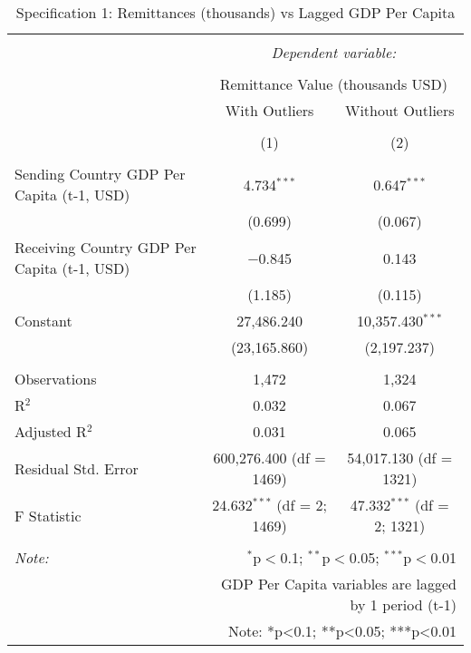 
\begin{table}[!htbp] \centering 
  \caption{Specification 1: Remittances (thousands) vs Lagged GDP Per Capita} 
  \label{} 
\begin{tabular}{@{\extracolsep{5pt}}lcc} 
\\[-1.8ex]\hline 
\hline \\[-1.8ex] 
 & \multicolumn{2}{c}{\textit{Dependent variable:}} \\ 
\cline{2-3} 
\\[-1.8ex] & \multicolumn{2}{c}{Remittance Value (thousands USD)} \\ 
 & With Outliers & Without Outliers \\ 
\\[-1.8ex] & (1) & (2)\\ 
\hline \\[-1.8ex] 
 Sending Country GDP Per Capita (t-1, USD) & 4.734$^{***}$ & 0.647$^{***}$ \\ 
  & (0.699) & (0.067) \\ 
  Receiving Country GDP Per Capita (t-1, USD) & $-$0.845 & 0.143 \\ 
  & (1.185) & (0.115) \\ 
  Constant & 27,486.240 & 10,357.430$^{***}$ \\ 
  & (23,165.860) & (2,197.237) \\ 
 \hline \\[-1.8ex] 
Observations & 1,472 & 1,324 \\ 
R$^{2}$ & 0.032 & 0.067 \\ 
Adjusted R$^{2}$ & 0.031 & 0.065 \\ 
Residual Std. Error & 600,276.400 (df = 1469) & 54,017.130 (df = 1321) \\ 
F Statistic & 24.632$^{***}$ (df = 2; 1469) & 47.332$^{***}$ (df = 2; 1321) \\ 
\hline 
\hline \\[-1.8ex] 
\textit{Note:}  & \multicolumn{2}{r}{$^{*}$p$<$0.1; $^{**}$p$<$0.05; $^{***}$p$<$0.01} \\ 
 & \multicolumn{2}{r}{GDP Per Capita variables are lagged by 1 period (t-1)} \\ 
 & \multicolumn{2}{r}{Note: *p<0.1; **p<0.05; ***p<0.01} \\ 
\end{tabular} 
\end{table} 
